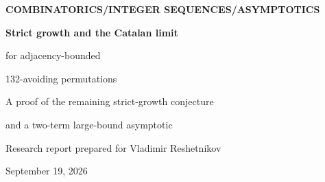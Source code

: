 \documentclass[11pt,a4paper]{article}
\theoremstyle{definition}\newaliascnt{definition}{theorem}
\theoremstyle{remark}\newaliascnt{remark}{theorem}
\begin{document}
\thispagestyle{empty}
\enlargethispage{3\baselineskip}%
\begin{center}
{\small\sffamily\color{Forest}\bfseries COMBINATORICS\quad /\quad INTEGER SEQUENCES\quad /\quad ASYMPTOTICS}\par
\vspace{1mm}
{\LARGE\bfseries Strict growth and the Catalan limit\par
for adjacency-bounded\par
132-avoiding permutations}\par
\vspace{1mm}
{\large A proof of the remaining strict-growth conjecture\par
and a two-term large-bound asymptotic}\par
\vspace{1mm}
{\sffamily Research report prepared for Vladimir Reshetnikov}\par
{\small September 19, 2026}
\end{center}
\vspace{0mm}
\end{document}
